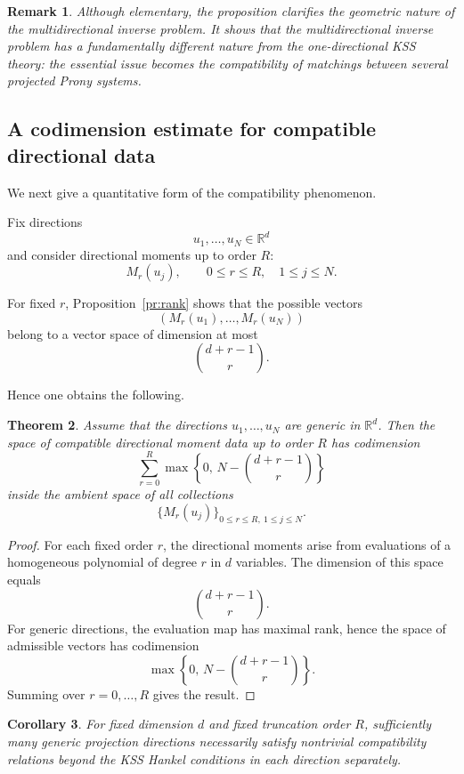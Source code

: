 \documentclass[reqno]{amsart}
\newtheorem{theorem}{Theorem}
\numberwithin{theorem}{section}
\newtheorem{corollary}[theorem]{Corollary}
\newtheorem{remark}[theorem]{Remark}
\newcommand{\RR}{\mathbb{R}}
\begin{document}
\begin{remark}
Although elementary, the proposition clarifies the geometric nature of the multidirectional inverse problem.  It shows that
the multidirectional inverse problem has a fundamentally different nature
from the one-directional KSS theory: the essential issue becomes the
compatibility of matchings between several projected Prony systems.
\end{remark}

\subsection{A codimension estimate for compatible directional data}

We next give a quantitative form of the compatibility phenomenon.

Fix directions
\[
u_1,\dots,u_N\in\RR^d
\]
and consider directional moments up to order $R$:
\[
M_r(u_j),
\qquad
0\le r\le R,\quad 1\le j\le N.
\]

For fixed $r$, Proposition~\ref{pr:rank} shows that the possible vectors
\[
(M_r(u_1),\dots,M_r(u_N))
\]
belong to a vector space of dimension at most
\[
\binom{d+r-1}{r}.
\]

Hence one obtains the following.

\begin{theorem}\label{th:codim}
Assume that the directions $u_1,\dots,u_N$ are generic in $\RR^d$.
Then the space of compatible directional moment data up to order $R$ has
codimension
\[
\sum_{r=0}^R
\max\left\{
0,\,
N-\binom{d+r-1}{r}
\right\}
\]
inside the ambient space of all collections
\[
\{M_r(u_j)\}_{0\le r\le R,\ 1\le j\le N}.
\]
\end{theorem}

\begin{proof}
For each fixed order $r$, the directional moments arise from evaluations of
a homogeneous polynomial of degree $r$ in $d$ variables.  The dimension of
this space equals
\[
\binom{d+r-1}{r}.
\]
For generic directions, the evaluation map has maximal rank, hence the
space of admissible vectors has codimension
\[
\max\left\{
0,\,
N-\binom{d+r-1}{r}
\right\}.
\]
Summing over $r=0,\dots,R$ gives the result.
\end{proof}

\begin{corollary}
For fixed dimension $d$ and fixed truncation order $R$, sufficiently many
generic projection directions necessarily satisfy nontrivial compatibility
relations beyond the KSS Hankel conditions in each direction separately.
\end{corollary}
\end{document}
